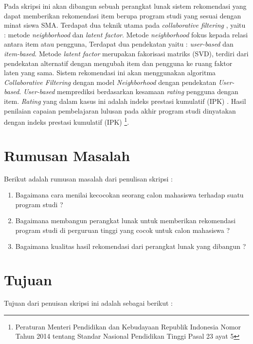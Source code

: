 Pada skripsi ini akan dibangun sebuah perangkat lunak sistem rekomendasi yang dapat memberikan rekomendasi item berupa program studi yang sesuai dengan minat siswa SMA. Terdapat dua teknik utama pada \textit{collaborative filtering} \cite{buku:sistem:rekomendasi}, yaitu : metode \textit{neighborhood} dan \textit{latent factor}. Metode \textit{neighborhood} fokus kepada relasi antara item atau pengguna, Terdapat dua pendekatan yaitu : \textit{user-based} dan \textit{item-based}. Metode \textit{latent factor} merupakan fakorisasi matriks (SVD), terdiri dari pendekatan alternatif dengan mengubah item dan pengguna ke ruang faktor laten yang sama. Sistem rekomendasi ini akan menggunakan algoritma \textit{Collaborative Filtering} dengan model \textit{Neighborhood} dengan pendekatan \textit{User-based}. \textit{User-based} memprediksi berdasarkan kesamaan \textit{rating} pengguna dengan item. \textit{Rating} yang dalam kasus ini adalah indeks prestasi kumulatif (IPK) . Hasil penilaian capaian pembelajaran lulusan pada akhir program studi dinyatakan dengan indeks prestasi kumulatif (IPK) \footnote{Peraturan Menteri Pendidikan dan Kebudayaan Republik Indonesia Nomor Tahun 2014 tentang Standar Nasional Pendidikan Tinggi Pasal 23 ayat 5}.

\section{Rumusan Masalah}
\label{sec:rumusan masalah}
Berikut adalah rumusan masalah dari penulisan skripsi : 

\begin{enumerate}
	\item Bagaimana cara menilai kecocokan seorang calon mahasiswa terhadap suatu program studi ?
	
	\item Bagaimana membangun perangkat lunak untuk memberikan rekomendasi program studi di perguruan tinggi yang cocok untuk calon mahasiswa ?
	
	\item Bagaimana kualitas hasil rekomendasi dari perangkat lunak yang dibangun ?
\end{enumerate}

\section{Tujuan}
\label{sec:tujuan}
Tujuan dari penuisan skripsi ini adalah sebagai berikut : 

